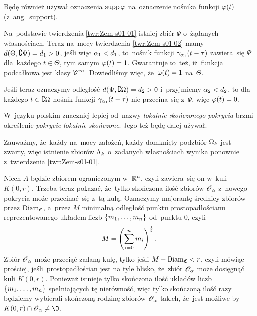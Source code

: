 \documentclass[a4paper,11pt]{article}
\begin{document}
Będę również używał oznaczenia $\mathrm{supp}\, \varphi$ na~oznaczenie nośnika
funkcji $\varphi( t )$ (z~ang.~support).

\vspace{\spaceFour}


\start {}  Na~podstawie
twierdzenia \ref{twr:Zem-s01-01} istniej zbiór $\Psi$ o~żądanych
własnościach. Teraz na~mocy twierdzenia \eqref{twr:Zem-s01-02} mamy
$d( \Theta, \complement \Psi ) = d_{ 1 } > 0$, jeśli więc
$\alpha_{ 1 } < d_{ 1 }$, to~nośnik funkcji
$\gamma_{ \alpha_{ 1 } }( t - \tau )$ zawiera~się $\Psi$ dla~każdego
$t \in \Theta$, tym samym $\varphi( t ) = 1$. Gwarantuje to~też,
iż~funkcja podcałkowa jest klasy $\mathcal{C}^{ \infty }$. Dowiedliśmy więc,
że~$\varphi( t ) = 1$ na~$\Theta$.

Jeśli teraz oznaczymy odległość $d( \Psi, \complement \Omega ) = d_{ 2 } > 0$
i~przyjmiemy $\alpha_{ 2 } < d_{ 2 }$, to dla każdego $t \in \complement \Omega$
nośnik funkcji $\gamma_{ \alpha_{ 1 } }( t - \tau )$ nie przecina~się
z~$\Psi$, więc $\varphi( t ) = 0$.

\vspace{\spaceFour}


\start {} W~języku polskim znaczniej lepiej od~nazwy
\emph{lokalnie skończonego pokrycia} brzmi określenie \emph{pokrycie
  lokalnie skończone}. Jego też będę dalej używał.

\vspace{\spaceFour}


\start {}  Zauważmy, że~każdy na~mocy
założeń, każdy domknięty podzbiór $\Omega_{ k }$ jest zwarty, więc
istnienie zbiorów $\Lambda_{ k }$ o~zadanych własnościach wynika ponownie
z~twierdzenia \eqref{twr:Zem-s01-01}.

\vspace{\spaceFour}


\start {}  Niech $A$ będzie zbiorem
ograniczonym w~$\mathbb{ R }^{ n }$, czyli zawiera~się on w~kuli $K( 0, r )$. Trzeba
teraz pokazać, że~tylko skończona ilość zbiorów $\mathcal{O}_{ \alpha }$ z~nowego
pokrycia może przecinać~się z~tą kulą. Oznaczymy majorantę średnicy
zbiorów przez $\mathrm{Diam}_{ \mathfrak{ C } }$, a~przez $M$ minimalną
odległość punktu prostopadłościanu reprezentowanego układem liczb
$\{ m_{ 1 }, \ldots, m_{ n } \}$ od~punktu $0$, czyli
\begin{equation}
  \label{eq:Zem-s01-06}
  M = \left( \sum\limits_{ i = 0 }^{ n } m_{ i } \right)^{ \frac{ 1 }{ 2 } }.
\end{equation}
Zbiór $\mathcal{O}_{ \alpha }$ może przeciąć zadaną kulę, tylko jeśli
$M - \mathrm{Diam}_{ \mathfrak{C} } < r$, czyli mówiąc prościej,
jeśli~prostopadłościan jest na tyle blisko, że~zbiór $\mathcal{O}_{ \alpha }$
może dosięgnąć kuli $K( 0, r )$. Ponieważ istnieje tylko skończona
ilość układów liczb $\{ m_{ 1 }, \ldots, m_{ n } \}$ spełniających tę
nierówność, więc tylko skończoną ilość razy będziemy wybierali
skończoną rodzinę zbiorów $\mathcal{O}_{ \alpha }$ takich, że~jest możliwe
by~$K( 0, r ) \cap \Oc_{ \al } \neq \O$.
\end{document}
